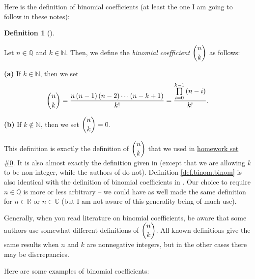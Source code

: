 \documentclass[numbers=enddot,12pt,final,onecolumn,notitlepage]{scrartcl}%
\numberwithin{exer}{subsection}
\theoremstyle{definition}
\newtheorem{defi}[theo]{Definition}
\newenvironment{definition}[1][]
{\begin{defi}[#1]\begin{leftbar}}
{\end{leftbar}\end{defi}}
\let\prodnonlimits\prod
\renewcommand{\prod}{\prodnonlimits\limits}
\begin{document}
Here is the definition of binomial coefficients (at least the one I am going
to follow in these notes):

\begin{definition}
\label{def.binom.binom}Let $n\in\mathbb{Q}$ and $k\in\mathbb{N}$. Then, we
define the \textit{binomial coefficient} $\dbinom{n}{k}$ as follows:

\textbf{(a)} If $k\in\mathbb{N}$, then we set
\[
\dbinom{n}{k}=\dfrac{n\left(  n-1\right)  \left(  n-2\right)  \cdots\left(
n-k+1\right)  }{k!}=\dfrac{\prod_{i=0}^{k-1}\left(  n-i\right)  }{k!}.
\]


\textbf{(b)} If $k\notin\mathbb{N}$, then we set $\dbinom{n}{k}=0$.
\end{definition}

This definition is exactly the definition of $\dbinom{n}{k}$ that we used in
\href{http://www-users.math.umn.edu/~dgrinber/19s/hw0s.pdf}{homework set \#0}.
It is also almost exactly the definition given in \cite[(5.1)]{GKP} (except
that we are allowing $k$ to be non-integer, while the authors of \cite{GKP} do
not). Definition \ref{def.binom.binom} is also identical with the definition
of binomial coefficients in \cite{detnotes}. Our choice to require
$n\in\mathbb{Q}$ is more or less arbitrary -- we could have as well made the
same definition for $n\in\mathbb{R}$ or $n\in\mathbb{C}$ (but I am not aware
of this generality being of much use).

Generally, when you read literature on binomial coefficients, be aware that
some authors use somewhat different definitions of $\dbinom{n}{k}$. All known
definitions give the same results when $n$ and $k$ are nonnegative integers,
but in the other cases there may be discrepancies.

Here are some examples of binomial coefficients:
\end{document}
